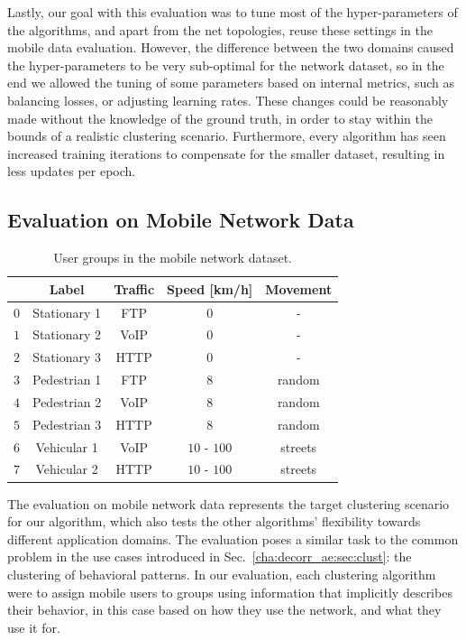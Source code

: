 			Lastly, our goal with this evaluation was to tune most of the hyper-parameters of the algorithms, and apart from the net topologies, reuse these settings in the mobile data evaluation.
			However, the difference between the two domains caused the hyper-parameters to be very sub-optimal for the network dataset, so in the end we allowed the tuning of some parameters based on internal metrics, such as balancing losses, or adjusting learning rates.
			These changes could be reasonably made without the knowledge of the ground truth, in order to stay within the bounds of a realistic clustering scenario.
			Furthermore, every algorithm has seen increased training iterations to compensate for the smaller dataset, resulting in less updates per epoch.	
			
		\subsection{Evaluation on Mobile Network Data}
			
			\begin{table}[!ht]
				\centering
				\renewcommand*{\arraystretch}{1.25}
				\begin{tabular}{l|c|c|c|c}
					& Label        & Traffic   & Speed [km/h] & Movement \\
					\hline
					$0$ & Stationary 1 & FTP  & $0$          & -       \\
					$1$ & Stationary 2 & VoIP & $0$          & -       \\
					$2$ & Stationary 3 & HTTP & $0$          & -       \\
					$3$ & Pedestrian 1 & FTP  & $8$          & random  \\
					$4$ & Pedestrian 2 & VoIP & $8$          & random  \\
					$5$ & Pedestrian 3 & HTTP & $8$          & random  \\
					$6$ & Vehicular 1  & VoIP & $10$ - $100$ & streets \\
					$7$ & Vehicular 2  & HTTP & $10$ - $100$ & streets \\
				\end{tabular}
				\caption[User groups in the DANCE mobile network dataset]{User groups in the mobile network dataset.}
				\label{tab:user_groups}
			\end{table}
			
			The evaluation on mobile network data represents the target clustering scenario for our algorithm, which also tests the other algorithms' flexibility towards different application domains.
			The evaluation poses a similar task to the common problem in the use cases introduced in Sec.~\ref{cha:decorr_ae:sec:clust}: the clustering of behavioral patterns.		
			In our evaluation, each clustering algorithm were to assign mobile users to groups using information that implicitly describes their behavior, in this case based on how they use the network, and what they use it for.
			
